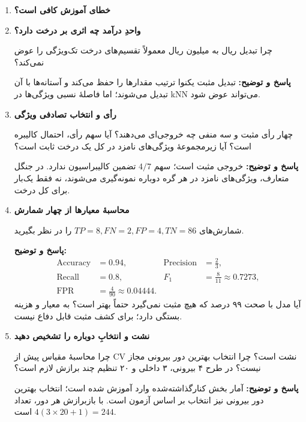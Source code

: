 \documentclass[12pt,a4paper,oneside]{report}
\newcounter{ex}[chapter]
\newenvironment{selftests}{\begin{enumerate}\setlength{\itemsep}{9pt}}{\end{enumerate}}
\newenvironment{selftest}[1]{\item\textbf{#1}\par}{\par}
\newcommand{\answer}[1]{\par{\color{teal}\bfseries پاسخ و توضیح: }#1\par}
\begin{document}
\begin{selftests}
\begin{selftest}{خطای آموزش کافی است؟}
\end{selftest}
\begin{selftest}{واحدِ درآمد چه اثری بر درخت دارد؟}
چرا تبدیل ریال به میلیون ریال معمولاً تقسیم‌های درخت تک‌ویژگی را عوض نمی‌کند؟
\answer{تبدیل مثبت یکنوا ترتیب مقدارها را حفظ می‌کند و آستانه‌ها با آن تبدیل می‌شوند؛ اما فاصلهٔ نسبی ویژگی‌ها در kNN می‌تواند عوض شود.}
\end{selftest}
\begin{selftest}{رأی و انتخاب تصادفی ویژگی}
چهار رأی مثبت و سه منفی چه خروجی‌ای می‌دهند؟ آیا سهم رأی، احتمال کالیبره است؟ آیا زیرمجموعهٔ ویژگی‌های نامزد در کل یک درخت ثابت است؟
\answer{خروجی مثبت است؛ سهم $4/7$ تضمین کالیبراسیون ندارد. در جنگل متعارف، ویژگی‌های نامزد در هر گره دوباره نمونه‌گیری می‌شوند، نه فقط یک‌بار برای کل درخت.}
\end{selftest}
\begin{selftest}{محاسبهٔ معیارها از چهار شمارش}
شمارش‌های $TP=8,FN=2,FP=4,TN=86$ را در نظر بگیرید.
\answer{\begin{align*}
\operatorname{Accuracy}&=0.94,&\operatorname{Precision}&=\frac23,\\
\operatorname{Recall}&=0.8,&F_1&=\frac8{11}\approx0.7273,\\
\operatorname{FPR}&=\frac4{90}\approx0.04444.
\end{align*}
آیا مدل با صحت ۹۹ درصد که هیچ مثبت نمی‌گیرد حتماً بهتر است؟ به معیار و هزینه بستگی دارد؛ برای کشف مثبت قابل دفاع نیست.}
\end{selftest}
\begin{selftest}{نشت و انتخابِ دوباره را تشخیص دهید}
چرا محاسبهٔ مقیاس پیش از CV نشت است؟ چرا انتخاب بهترین دور بیرونی مجاز نیست؟ در طرح ۴ بیرونی، ۳ داخلی و ۲۰ تنظیم چند برازش لازم است؟
\answer{آمار بخش کنارگذاشته‌شده وارد آموزش شده است؛ انتخاب بهترین دور بیرونی نیز انتخاب بر اساس آزمون است. با بازبرازش هر دور، تعداد $4(3\times20+1)=244$ است.}
\end{selftest}
\end{selftests}

\end{document}
